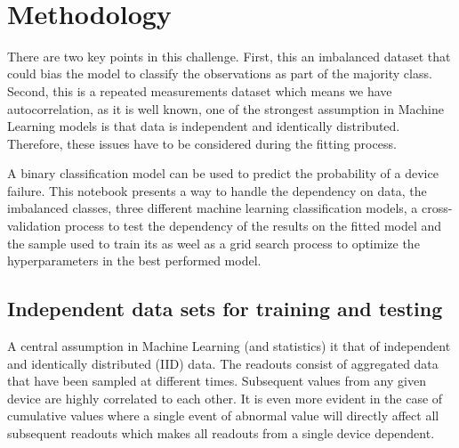 \documentclass[11pt]{article}
\begin{document}
    \begin{center}
    \end{center}
    { \hspace*{\fill} \\}
    
    \hypertarget{methodology}{%
\section{Methodology}\label{methodology}}

    There are two key points in this challenge. First, this an imbalanced
dataset that could bias the model to classify the observations as part
of the majority class. Second, this is a repeated measurements dataset
which means we have autocorrelation, as it is well known, one of the
strongest assumption in Machine Learning models is that data is
independent and identically distributed. Therefore, these issues have to
be considered during the fitting process.

A binary classification model can be used to predict the probability of
a device failure. This notebook presents a way to handle the dependency
on data, the imbalanced classes, three different machine learning
classification models, a cross-validation process to test the dependency
of the results on the fitted model and the sample used to train its as
weel as a grid search process to optimize the hyperparameters in the
best performed model.

    \hypertarget{independent-data-sets-for-training-and-testing}{%
\subsection{Independent data sets for training and
testing}\label{independent-data-sets-for-training-and-testing}}

    A central assumption in Machine Learning (and statistics) it that of
independent and identically distributed (IID) data. The readouts consist
of aggregated data that have been sampled at different times. Subsequent
values from any given device are highly correlated to each other. It is
even more evident in the case of cumulative values where a single event
of abnormal value will directly affect all subsequent readouts which
makes all readouts from a single device dependent.

~\\
\end{document}
